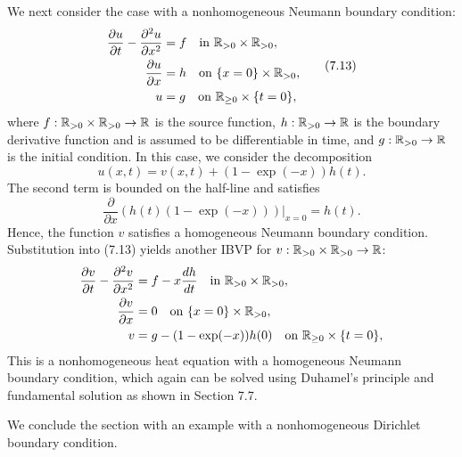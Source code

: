 We next consider the case with a nonhomogeneous Neumann boundary condition:
\begin{equation*}
    \begin{aligned}
        \frac{\partial u}{\partial t} - \frac{\partial^2 u}{\partial x^2} &= f \quad \text{in } \mathbb{R}_{>0} \times \mathbb{R}_{>0}, \\
        \frac{\partial u}{\partial x} &= h \quad \text{on } \{x = 0\} \times \mathbb{R}_{>0}, \\
        u &= g \quad \text{on } \mathbb{R}_{\geq 0} \times \{t = 0\},
    \end{aligned} \tag{7.13}
\end{equation*}
where $f : \mathbb{R}_{>0} \times \mathbb{R}_{>0} \to \mathbb{R}$ is the source function, $h : \mathbb{R}_{>0} \to \mathbb{R}$ is the boundary derivative function and is assumed to be differentiable in time, and $g : \mathbb{R}_{>0} \to \mathbb{R}$ is the initial condition. In this case, we consider the decomposition
\[u(x, t) = v(x, t) + (1 - \exp(-x)) h(t).\]
The second term is bounded on the half-line and satisfies
\[\frac{\partial}{\partial x} \left(h(t)(1 - \exp(-x))\right) \Big|_{x=0} = h(t).\]
Hence, the function $v$ satisfies a homogeneous Neumann boundary condition. Substitution into (7.13) yields another IBVP for $v : \mathbb{R}_{>0} \times \mathbb{R}_{>0} \to \mathbb{R}$:
\begin{align*}
    \frac{\partial v}{\partial t} - \frac{\partial^2 v}{\partial x^2} &= f - x \frac{dh}{dt} \quad \text{in } \mathbb{R}_{>0} \times \mathbb{R}_{>0}, \\
    \frac{\partial v}{\partial x} &= 0 \quad \text{on } \{x = 0\} \times \mathbb{R}_{>0}, \\
    v &= g - (1 - \exp(-x)) h(0) \quad \text{on } \mathbb{R}_{\geq 0} \times \{t = 0\},
\end{align*}
This is a nonhomogeneous heat equation with a homogeneous Neumann boundary condition, which again can be solved using Duhamel's principle and fundamental solution as shown in Section 7.7.

We conclude the section with an example with a nonhomogeneous Dirichlet boundary condition.

